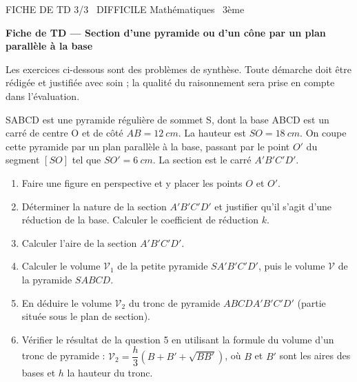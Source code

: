 \documentclass[11pt]{article}
\begin{document}
\begin{tcolorbox}[enhanced,colback=popink,colframe=popink,arc=10pt,boxrule=0pt,left=12pt,right=12pt,top=9pt,bottom=9pt]
{\color{white}\popxbold\small FICHE DE TD 3/3 \textbullet\ DIFFICILE \hfill Mathématiques \textbullet\ 3ème\par}
\end{tcolorbox}
\vspace{4pt}
\textbf{Fiche de TD — Section d'une pyramide ou d'un cône par un plan parallèle à la base}\par
\smallskip
Les exercices ci-dessous sont des problèmes de synthèse. Toute démarche doit être rédigée et justifiée avec soin ; la qualité du raisonnement sera prise en compte dans l'évaluation.

\begin{exercice}
SABCD est une pyramide régulière de sommet S, dont la base ABCD est un carré de centre O et de côté $AB = \SI{12}{cm}$. La hauteur est $SO = \SI{18}{cm}$. On coupe cette pyramide par un plan parallèle à la base, passant par le point $O'$ du segment $[SO]$ tel que $SO' = \SI{6}{cm}$. La section est le carré $A'B'C'D'$.
\begin{enumerate}
\item Faire une figure en perspective et y placer les points $O$ et $O'$.
\item Déterminer la nature de la section $A'B'C'D'$ et justifier qu'il s'agit d'une réduction de la base. Calculer le coefficient de réduction $k$.
\item Calculer l'aire de la section $A'B'C'D'$.
\item Calculer le volume $\mathcal{V}_1$ de la petite pyramide $SA'B'C'D'$, puis le volume $\mathcal{V}$ de la pyramide $SABCD$.
\item En déduire le volume $\mathcal{V}_2$ du tronc de pyramide $ABCDA'B'C'D'$ (partie située sous le plan de section).
\item Vérifier le résultat de la question 5 en utilisant la formule du volume d'un tronc de pyramide : $\mathcal{V}_2 = \dfrac{h}{3}\left(B + B' + \sqrt{BB'}\right)$, où $B$ et $B'$ sont les aires des bases et $h$ la hauteur du tronc.
\end{enumerate}
\end{exercice}
\end{document}
